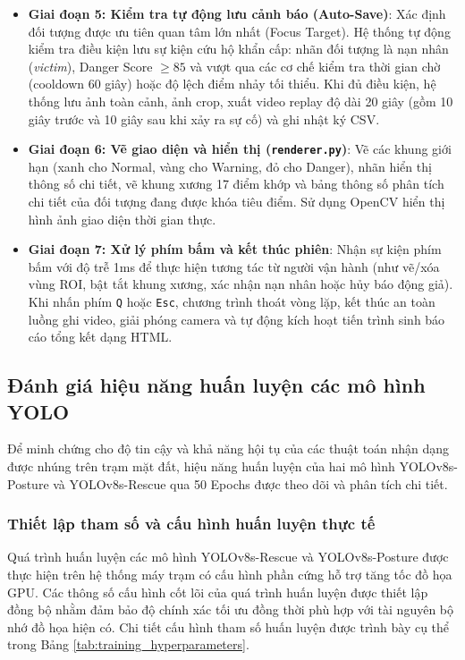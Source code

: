 \begin{itemize}
    \item \textbf{Giai đoạn 5: Kiểm tra tự động lưu cảnh báo (Auto-Save)}:
    Xác định đối tượng được ưu tiên quan tâm lớn nhất (Focus Target). Hệ thống tự động kiểm tra điều kiện lưu sự kiện cứu hộ khẩn cấp: nhãn đối tượng là nạn nhân (\textit{victim}), Danger Score $\ge 85$ và vượt qua các cơ chế kiểm tra thời gian chờ (cooldown 60 giây) hoặc độ lệch điểm nhảy tối thiểu. Khi đủ điều kiện, hệ thống lưu ảnh toàn cảnh, ảnh crop, xuất video replay độ dài 20 giây (gồm 10 giây trước và 10 giây sau khi xảy ra sự cố) và ghi nhật ký CSV.
    
    \item \textbf{Giai đoạn 6: Vẽ giao diện và hiển thị (\texttt{renderer.py})}:
    Vẽ các khung giới hạn (xanh cho Normal, vàng cho Warning, đỏ cho Danger), nhãn hiển thị thông số chi tiết, vẽ khung xương 17 điểm khớp và bảng thông số phân tích chi tiết của đối tượng đang được khóa tiêu điểm. Sử dụng OpenCV hiển thị hình ảnh giao diện thời gian thực.
    
    \item \textbf{Giai đoạn 7: Xử lý phím bấm và kết thúc phiên}:
    Nhận sự kiện phím bấm với độ trễ 1ms để thực hiện tương tác từ người vận hành (như vẽ/xóa vùng ROI, bật tắt khung xương, xác nhận nạn nhân hoặc hủy báo động giả). Khi nhấn phím \texttt{Q} hoặc \texttt{Esc}, chương trình thoát vòng lặp, kết thúc an toàn luồng ghi video, giải phóng camera và tự động kích hoạt tiến trình sinh báo cáo tổng kết dạng HTML.
\end{itemize}

\subsection{Đánh giá hiệu năng huấn luyện các mô hình YOLO}

Để minh chứng cho độ tin cậy và khả năng hội tụ của các thuật toán nhận dạng được nhúng trên trạm mặt đất, hiệu năng huấn luyện của hai mô hình YOLOv8s-Posture và YOLOv8s-Rescue qua 50 Epochs được theo dõi và phân tích chi tiết.

\subsubsection{Thiết lập tham số và cấu hình huấn luyện thực tế}

Quá trình huấn luyện các mô hình YOLOv8s-Rescue và YOLOv8s-Posture được thực hiện trên hệ thống máy trạm có cấu hình phần cứng hỗ trợ tăng tốc đồ họa GPU. Các thông số cấu hình cốt lõi của quá trình huấn luyện được thiết lập đồng bộ nhằm đảm bảo độ chính xác tối ưu đồng thời phù hợp với tài nguyên bộ nhớ đồ họa hiện có. Chi tiết cấu hình tham số huấn luyện được trình bày cụ thể trong Bảng \ref{tab:training_hyperparameters}.

